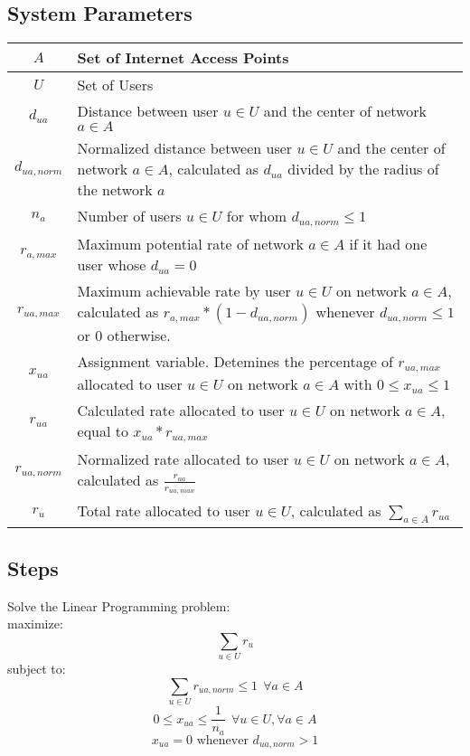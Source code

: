 \documentclass[11pt]{article}
\begin{document}
\subsection{System Parameters}
\begin{center}
\renewcommand\arraystretch{1.3}
\begin{tabular}{| c | p{12cm} |}
\hline
$A$ & Set of Internet Access Points \\ 
\hline
$U$ & Set of Users \\ 
\hline
$d_{ua}$ & Distance between user $u \in U$ and the center of network $a \in A$ \\ 
\hline
$d_{ua,norm}$ & Normalized distance between user $u \in U$ and the center of network $a \in A$, calculated as $d_{ua}$ divided by the radius of the network $a$ \\ 
\hline
$n_a$ & Number of users $u \in U$ for whom $d_{ua,norm} \leq 1$\\ 
\hline
$r_{a,max}$ & Maximum potential rate of network $a \in A$ if it had one user whose $d_{ua} = 0$ \\ 
\hline
$r_{ua,max}$ & Maximum achievable rate by user $u \in U$ on network $a \in A$, calculated as $r_{a,max} * (1 - d_{ua,norm})$ whenever $d_{ua,norm} \leq 1$ or 0 otherwise. \\ 
\hline
$x_{ua}$ & Assignment variable. Detemines the percentage of $r_{ua,max}$ allocated to user $u \in U$ on network $a \in A$ with $0 \leq x_{ua} \leq 1$ \\ 
\hline
$r_{ua}$ & Calculated rate allocated to user $u \in U$ on network $a \in A$, equal to $x_{ua} * r_{ua,max}$ \\ 
\hline
$r_{ua,norm}$ & Normalized rate allocated to user $u \in U$ on network $a \in A$, calculated as $\displaystyle\frac{r_{ua}}{r_{ua,max}}$ \\[8pt] 
\hline
$r_{u}$ & Total rate allocated to user $u \in U$, calculated as $\sum_{a \in A} r_{ua}$ \\ 
\hline
\end{tabular}
\end{center}
\pagebreak
\subsection{Steps}
Solve the Linear Programming problem: \\ 
\indent \indent \indent \indent maximize:
$$\sum_{u \in U} r_u$$
\indent \indent \indent \indent subject to:
\begin{equation} \label{eq1}
\sum_{u \in U} r_{ua,norm} \leq 1 \ \ \forall a \in A
\end{equation}
\begin{equation}
0 \leq x_{ua} \leq \frac{1}{n_a} \ \ \forall u \in U, \forall a \in A
\end{equation}
\begin{equation}
x_{ua} = 0 \text{ whenever } d_{ua,norm} > 1
\end{equation}
\end{document}
